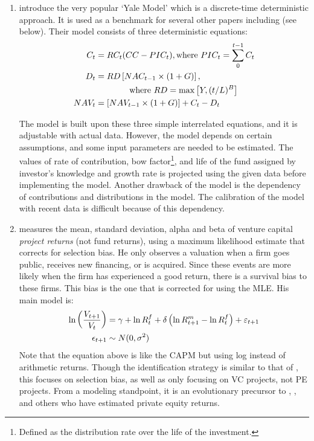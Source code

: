 \documentclass[final,5p,times,twocolumn,authoryear]{elsarticle}
\begin{document}
\begin{enumerate}[resume, label=(\roman*)]
	\item \cite{Takahashi2002} introduce the very popular `Yale Model' which is a discrete-time deterministic approach. It is used as a benchmark for several other papers including \cite{Karatas2021} (see below). Their model consists of three deterministic equations:
	\begin{align}
		C_t 		&= RC_t (CC - PIC_t), 				\text{where $PIC_t = \sum_0^{t-1} C_t$}		\\
		D_t 		&= RD \left[NAC_{t-1} \times (1 + G) \right], 	\\
				&\qquad \qquad \text{where $RD = \max \left[ Y, (t/L)^B \right]$}	\notag \\
		NAV_t	&= \left[ NAV_{t-1} \times (1 + G) \right] + C_t - D_t
	\end{align}
	
	The model is built upon these three simple interrelated equations, and it is adjustable with actual data. However, the model depends on certain assumptions, and some input parameters are needed to be estimated. The values of rate of contribution, bow factor\footnote{Defined as the distribution rate over the life of the investment.}, and life of the fund assigned by investor’s knowledge and growth rate is projected using the given data before implementing the model. Another drawback of the model is the dependency of contributions and distributions in the model. The calibration of the model with recent data is difficult because of this dependency.

	\item \cite{Cochrane2004} measures the mean, standard deviation, alpha and beta of venture capital \emph{project returns} (not fund returns), using a maximum likelihood estimate that corrects for selection bias. He only observes a valuation when a firm goes public, receives new financing, or is acquired. Since these events are more likely when the firm has experienced a good return, there is a survival bias to these firms. This bias is the one that is corrected for using the MLE. His main model is:
	\begin{align}
		\ln \left( \frac{V_{t+1}}{V_t} \right) &= \gamma + \ln R_t^f + \delta \left( \ln R_{t+1}^m - \ln R_t^f \right) + \varepsilon_{t+1} 	\\
		\epsilon_{t+1} &\sim N(0, \sigma^2) \notag
	\end{align}
	Note that the equation above is like the CAPM but using log instead of arithmetic returns. Though the identification strategy is similar to that of \cite{Ang2014}, this focuses on selection bias, as well as only focusing on VC projects, not PE projects. From a modeling standpoint, it is an evolutionary precursor to \cite{Ang2014}, \cite{Korteweg2011}, and others who have estimated private equity returns. 


\end{enumerate}
\end{document}
